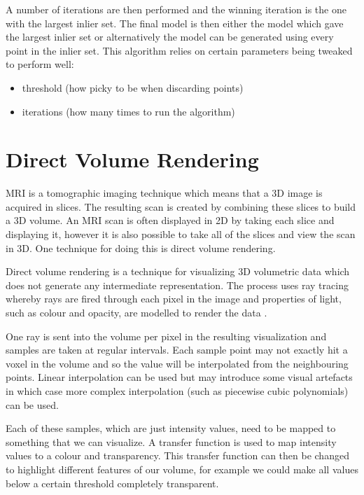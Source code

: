 A number of iterations are then performed and the winning iteration is the one with the largest inlier set. The final model is then either the model which gave the largest inlier set or alternatively the model can be generated using every point in the inlier set. This algorithm relies on certain parameters being tweaked to perform well:

\begin{itemize}
	\item threshold (how picky to be when discarding points)
	\item iterations (how many times to run the algorithm)
\end{itemize}

\newpage
\section{Direct Volume Rendering}\label{background:volumerendering}
MRI is a tomographic imaging technique which means that a 3D image is acquired in slices. The resulting scan is created by combining these slices to build a 3D volume. An MRI scan is often displayed in 2D by taking each slice and displaying it, however it is also possible to take all of the slices and view the scan in 3D. One technique for doing this is direct volume rendering.

Direct volume rendering is a technique for visualizing 3D volumetric data which does not generate any intermediate representation. The process uses ray tracing whereby rays are fired through each pixel in the image and properties of light, such as colour and opacity, are modelled to render the data \cite{nvidia:volumerendering}.

One ray is sent into the volume per pixel in the resulting visualization and samples are taken at regular intervals. Each sample point may not exactly hit a voxel in the volume and so the value will be interpolated from the neighbouring points. Linear interpolation can be used but may introduce some visual artefacts in which case more complex interpolation (such as piecewise cubic polynomials) can be used.

Each of these samples, which are just intensity values, need to be mapped to something that we can visualize. A transfer function is used to map intensity values to a colour and transparency. This transfer function can then be changed to highlight different features of our volume, for example we could make all values below a certain threshold completely transparent.

